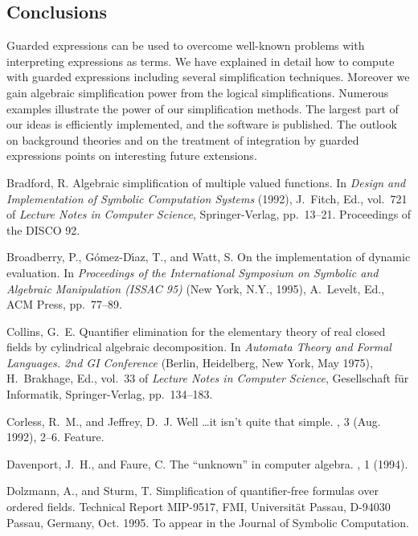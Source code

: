 \subsection{Conclusions}
Guarded expressions can be used to overcome well-known problems with
interpreting expressions as terms. We have explained in detail how to
compute with guarded expressions including several simplification
techniques. Moreover we gain algebraic simplification power from the
logical simplifications. Numerous examples illustrate the power of our
simplification methods. The largest part of our ideas is efficiently
implemented, and the software is published. The outlook on background
theories and on the treatment of integration by guarded expressions
points on interesting future extensions.
\nocite{Bradford:92}

\begin{thebibliography}{10}

{Bradford, R.}
\newblock Algebraic simplification of multiple valued functions.
\newblock In {\em Design and Implementation of Symbolic Computation Systems\/}
  (1992), J.~Fitch, Ed., vol.~721 of {\em Lecture Notes in Computer Science},
  Springer-Verlag, pp.~13--21.
\newblock Proceedings of the DISCO 92.

{Broadberry, P., G\'omez-D\'{\i}az, T., and Watt, S.}
\newblock On the implementation of dynamic evaluation.
\newblock In {\em Proceedings of the International Symposium on Symbolic and
  Algebraic Manipulation (ISSAC 95)\/} (New York, N.Y., 1995), A.~Levelt, Ed.,
  ACM Press, pp.~77--89.

{Collins, G.~E.}
\newblock Quantifier elimination for the elementary theory of real closed
  fields by cylindrical algebraic decomposition.
\newblock In {\em Automata Theory and Formal Languages. 2nd GI Conference\/}
  (Berlin, Heidelberg, New York, May 1975), H.~Brakhage, Ed., vol.~33 of {\em
  Lecture Notes in Computer Science}, Gesellschaft f\"ur Informatik,
  Springer-Verlag, pp.~134--183.

{Corless, R.~M., and Jeffrey, D.~J.}
\newblock Well \dots it isn't quite that simple.
, 3 (Aug. 1992), 2--6.
\newblock Feature.

{Davenport, J.~H., and Faure, C.}
\newblock The ``unknown'' in computer algebra.
, 1 (1994).

{Dolzmann, A., and Sturm, T.}
\newblock Simplification of quan\-ti\-fier-free formulas over ordered fields.
\newblock Technical Report MIP-9517, FMI, Universit\"at Passau, D-94030 Passau,
  Germany, Oct. 1995.
\newblock To appear in the Journal of Symbolic Computation.


\end{thebibliography}
